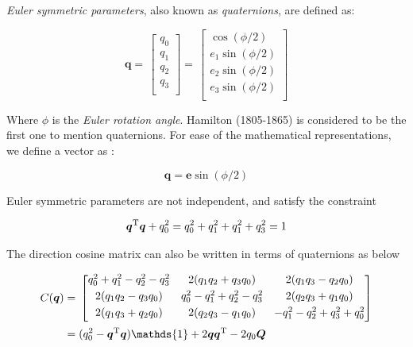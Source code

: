 \emph{Euler symmetric parameters}, also known as \emph{quaternions}, are defined as:
 
 \begin{equation}
 \label{eqn:quat3}
\bm{q}
=\,
\begin{bmatrix}
q_0\\[0.3em]
q_1\\[0.3em]
q_2\\[0.3em]
q_3\\[0.3em]
\end{bmatrix}
=\,
\begin{bmatrix}
\cos(\phi/2)\\[0.3em]
e_1 \sin(\phi/2)\\[0.3em]
e_2 \sin(\phi/2)\\[0.3em]
e_3 \sin(\phi/2)\\[0.3em]
\end{bmatrix}
\end{equation}
 
Where $\phi$ is the \emph{Euler rotation angle}. 
Hamilton (1805-1865) is considered to be the first one to mention quaternions. 
For ease of the mathematical representations, we define a vector as :

\begin{equation}
\label{eqn:quat3}
\bm{q} = \bm{e}\sin{(\phi/2)}
\end{equation}

Euler symmetric parameters are not independent, and satisfy the constraint

\begin{equation}
\label{eqn:quatNormConstraint}
\bm{q}^{\rm T} \bm{q} + q_0^2 = q_0^2 + q_1^2 +q_1^2 +q_3^2 = 1
\end{equation}

The direction cosine matrix can also be written in terms of quaternions as below

\begin{align}\label{eqn:Cquat}
\begin{split}
C(\bm{q})
 & =\,
\begin{bmatrix}
q_0^2 + q_1^2 - q_2^2 - q_3^2 & 2(q_1 q_2 + q_3 q_0) & 2(q_1 q_3 - q_2 q_0)\\[0.3em]
2(q_1 q_2 - q_3 q_0) & q_0^2 - q_1^2 + q_2^2 - q_3^2 & 2(q_2 q_3 + q_1 q_0)\\[0.3em]
2(q_1 q_3 + q_2 q_0) & 2(q_2 q_3 - q_1 q_0) & -q_1^2 - q_2^2 + q_3^2 + q_0^2\\[0.3em]
\end{bmatrix}
\\
& = (q_0^2 - \bm{q}^{\rm T}\bm{q} )\mathds{1} + 2\bm{q}\bm{q}^{\rm T} - 2q_0\bm{Q}
\end{split}
\end{align}
 

